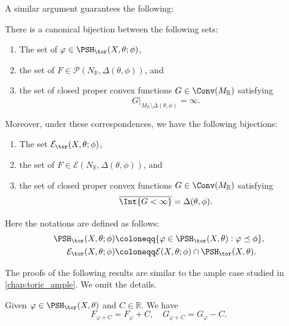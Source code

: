 A similar argument guarantees the following:
\begin{corollary}\label{cor:toric-big:L860}
    There is a canonical bijection between the following sets:
    \begin{enumerate}
        \item\label{itm:chapter-toricb:L739:1} The set of $\varphi\in \PSH_{\tor}(X,\theta;\phi)$,
        \item\label{itm:chapter-toricb:L739:2} the set of $F\in \mathcal{P}(N_{\mathbb{R}},\Delta(\theta,\phi))$, and
        \item\label{itm:chapter-toricb:L739:3} the set of closed proper convex functions $G\in \Conv(M_{\mathbb{R}})$ satisfying
        \[
        G|_{M_{\mathbb{R}}\setminus \Delta(\theta,\phi)}=\infty.
        \]
    \end{enumerate}
    Moreover, under these correspondences, we have the following bijections:
    \begin{enumerate}
        \item\label{itm:chapter-toricb:L748:1} The set $\mathcal{E}_{\tor}(X,\theta;\phi)$,
        \item\label{itm:chapter-toricb:L748:2} the set of $F\in \mathcal{E}(N_{\mathbb{R}},\Delta(\theta,\phi))$, and
        \item\label{itm:chapter-toricb:L748:3} the set of closed proper convex functions $G\in \Conv(M_{\mathbb{R}})$ satisfying
        \[
            \overline{\Int \{G<\infty\}}=\Delta(\theta,\phi).
        \]
    \end{enumerate}
\end{corollary}
Here the notations are defined as follows:
\[
\begin{aligned}
\PSH_{\tor}(X,\theta;\phi)\coloneqq & \{ \varphi\in \PSH_{\tor}(X,\theta):\varphi\preceq \phi \},\\
\mathcal{E}_{\tor}(X,\theta;\phi)\coloneqq & \mathcal{E}(X,\theta;\phi)\cap \PSH_{\tor}(X,\theta).
\end{aligned}
\]


The proofs of the following results are similar to the ample case studied in \cref{chap:toric_ample}. We omit the details.



\begin{proposition}\label{prop:toricpluscstbig}
    Given $\varphi\in \PSH_{\tor}(X,\theta)$ and $C\in \mathbb{R}$. We have
    \[
    F_{\varphi+C}=F_{\varphi}+C,\quad G_{\varphi+C}=G_{\varphi}-C.
    \]
\end{proposition}

